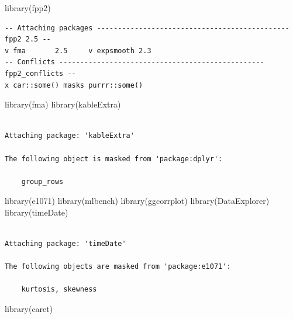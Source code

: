 \documentclass[
  letterpaper,
  DIV=11,
  numbers=noendperiod]{scrartcl}
\newenvironment{Shaded}{\begin{snugshade}}{\end{snugshade}}
\newcommand{\FunctionTok}[1]{\textcolor[rgb]{0.28,0.35,0.67}{#1}}
\newcommand{\NormalTok}[1]{\textcolor[rgb]{0.00,0.23,0.31}{#1}}
\begin{document}
\begin{Shaded}
\begin{Highlighting}[]
\FunctionTok{library}\NormalTok{(fpp2)}
\end{Highlighting}
\end{Shaded}

\begin{verbatim}
-- Attaching packages ---------------------------------------------- fpp2 2.5 --
v fma       2.5     v expsmooth 2.3
-- Conflicts ------------------------------------------------- fpp2_conflicts --
x car::some() masks purrr::some()
\end{verbatim}

\begin{Shaded}
\begin{Highlighting}[]
\FunctionTok{library}\NormalTok{(fma)}
\FunctionTok{library}\NormalTok{(kableExtra)}
\end{Highlighting}
\end{Shaded}

\begin{verbatim}

Attaching package: 'kableExtra'

The following object is masked from 'package:dplyr':

    group_rows
\end{verbatim}

\begin{Shaded}
\begin{Highlighting}[]
\FunctionTok{library}\NormalTok{(e1071)}
\FunctionTok{library}\NormalTok{(mlbench)}
\FunctionTok{library}\NormalTok{(ggcorrplot)}
\FunctionTok{library}\NormalTok{(DataExplorer)}
\FunctionTok{library}\NormalTok{(timeDate)}
\end{Highlighting}
\end{Shaded}

\begin{verbatim}

Attaching package: 'timeDate'

The following objects are masked from 'package:e1071':

    kurtosis, skewness
\end{verbatim}

\begin{Shaded}
\begin{Highlighting}[]
\FunctionTok{library}\NormalTok{(caret)}
\end{Highlighting}
\end{Shaded}
\end{document}
